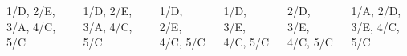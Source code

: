 \begin{columns}
  \begin{column}{.15\linewidth}\center
                  {1/D, 2/E, 3/A, 4/C, 5/C}
  \end{column}    
  \begin{column}{.15\linewidth}\center
                  {1/D, 2/E, 3/A, 4/C, 5/C}
  \end{column}    
  \begin{column}{.15\linewidth}\center
                  {1/D, 2/E,      4/C, 5/C}
  \end{column}    
  \begin{column}{.15\linewidth}\center
                  {1/D,      3/E, 4/C, 5/C}
  \end{column}    
  \begin{column}{.15\linewidth}\center
                  {     2/D, 3/E, 4/C, 5/C}
  \end{column}    
  \begin{column}{.15\linewidth}\center
                  {1/A, 2/D, 3/E, 4/C, 5/C}
  \end{column}    
\end{columns}
